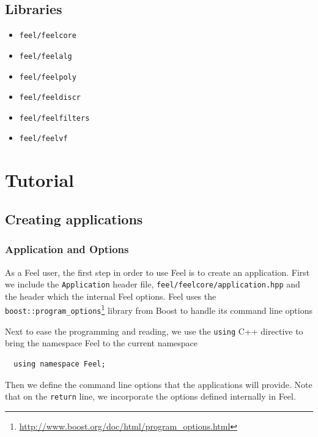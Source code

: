 \documentclass[a4paper]{book}
\newcommand{\cpp}{C{\hspace{-.3em}\vspace{-.2em}\tiny++}\xspace}
\newcommand{\feel}{Feel\xspace}
\begin{document}
\section{Libraries}

\begin{itemize}
\item \lstinline!feel/feelcore!
\item \lstinline!feel/feelalg!
\item \lstinline!feel/feelpoly!
\item \lstinline!feel/feeldiscr!
\item \lstinline!feel/feelfilters!
\item \lstinline!feel/feelvf!
\end{itemize}



\chapter{Tutorial}
\label{sec:tutorial}


\section{Creating applications}
\label{sec:creat-appl}



\subsection{Application and Options}
\label{sec:options}

As a \feel user, the first step in order to use \feel is to create an
application. First we include the \lstinline!Application! header file,
\lstinline!feel/feelcore/application.hpp! and the header which the
internal \feel options. \feel uses the
\lstinline!boost::program_options!\footnote{\url{http://www.boost.org/doc/html/program_options.html}}
library from Boost to handle its command line options




Next to ease the programming and reading, we use the \lstinline!using!
\cpp directive to bring the namespace Feel to the current namespace

\begin{lstlisting}
  using namespace Feel;
\end{lstlisting}

Then we define the command line options that the applications will
provide. Note that on the \lstinline!return! line, we incorporate the
options defined internally in \feel.
\end{document}
